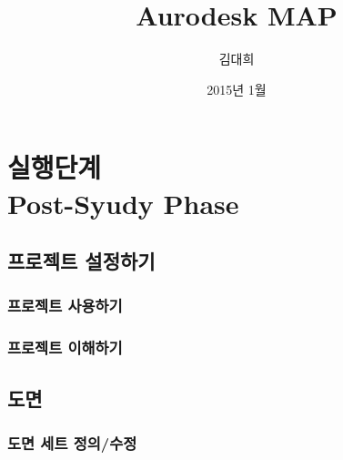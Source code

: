 \documentclass[12pt,a4paper,oneside]{book}
\begin{document}
	
			\dominitoc
			

			\title{Aurodesk MAP}
			\author{김대희}
			\date{2015년 1월}
			\maketitle


			\tableofcontents
			\listoffigures
			\listoftables

			



	\part{실행단계 \\ Post-Syudy Phase}


\newpage
\chapter{프로젝트 설정하기}

		\newpage
		\minitoc				%


	\newpage
	\section{프로젝트 사용하기}
	
	
	\newpage
	\section{프로젝트 이해하기}
	
	

\newpage
\chapter{도면}


	\newpage
	\section{도면 세트 정의/수정}
\end{document}
